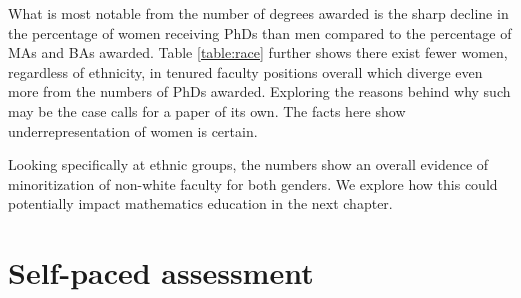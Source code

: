 What is most notable from the number of degrees awarded is the sharp decline in the percentage of women receiving PhDs than men compared to the percentage of MAs and BAs awarded. Table \ref{table:race} further shows there exist fewer women, regardless of ethnicity, in tenured faculty positions overall which diverge even more from the numbers of PhDs awarded. Exploring the reasons behind why such may be the case calls for a paper of its own. The facts here show underrepresentation of women is certain.

Looking specifically at ethnic groups, the numbers show an overall evidence of minoritization of non-white faculty for both genders. We explore how this could potentially impact mathematics education in the next chapter.

\section{Self-paced assessment}
